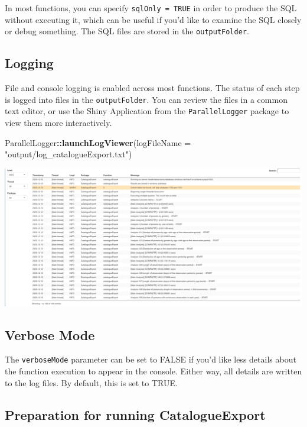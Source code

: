 \documentclass[
]{article}
\newenvironment{Shaded}{\begin{snugshade}}{\end{snugshade}}
\newcommand{\DataTypeTok}[1]{\textcolor[rgb]{0.13,0.29,0.53}{#1}}
\newcommand{\KeywordTok}[1]{\textcolor[rgb]{0.13,0.29,0.53}{\textbf{#1}}}
\newcommand{\NormalTok}[1]{#1}
\newcommand{\OperatorTok}[1]{\textcolor[rgb]{0.81,0.36,0.00}{\textbf{#1}}}
\newcommand{\StringTok}[1]{\textcolor[rgb]{0.31,0.60,0.02}{#1}}
\begin{document}
In most functions, you can specify \texttt{sqlOnly\ =\ TRUE} in order to
produce the SQL without executing it, which can be useful if you'd like
to examine the SQL closely or debug something. The SQL files are stored
in the \texttt{outputFolder}.

\hypertarget{logging}{%
\subsection{Logging}\label{logging}}

File and console logging is enabled across most functions. The status of
each step is logged into files in the \texttt{outputFolder}. You can
review the files in a common text editor, or use the Shiny Application
from the \texttt{ParallelLogger} package to view them more
interactively.

\begin{Shaded}
\begin{Highlighting}[]
\NormalTok{ParallelLogger}\OperatorTok{::}\KeywordTok{launchLogViewer}\NormalTok{(}\DataTypeTok{logFileName =} \StringTok{"output/log_catalogueExport.txt"}\NormalTok{)}
\end{Highlighting}
\end{Shaded}

\includegraphics{../inst/doc/logging_screenshot.png}

\hypertarget{verbose-mode}{%
\subsection{Verbose Mode}\label{verbose-mode}}

The \texttt{verboseMode} parameter can be set to FALSE if you'd like
less details about the function execution to appear in the console.
Either way, all details are written to the log files. By default, this
is set to TRUE.

\hypertarget{preparation-for-running-catalogueexport}{%
\subsection{Preparation for running
CatalogueExport}\label{preparation-for-running-catalogueexport}}
\end{document}
